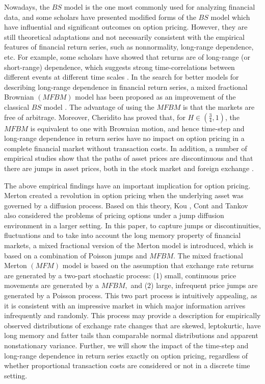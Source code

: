\documentclass[a4paper,11pt]{amsart}
\numberwithin{equation}{section}
\theoremstyle{definition}
\theoremstyle{plain}
\theoremstyle{definition}
\newcommand{\1}{\mathbf{1}}
\begin{document}
Nowadays, the $BS$ model is the one most
commonly used for analyzing financial data, and some
scholars have presented modified forms of the $BS$ model which
have influential and significant outcomes on option pricing.
However, they are still theoretical adaptations and not necessarily
consistent with the empirical features of financial return
series, such as nonnormality, long-range dependence, etc.
For example, some scholars \cite{willinger,ozdemir,mariani,sottinen2003arbitrage,sottinen2016pathwise} have showed that returns are of long-range (or short-range) dependence, which suggests strong time-correlations
between different events at different time scales \cite{cajueiro,cajueiro2,mandelbrot}. In the search
for better models for describing long-range dependence in financial return series, a mixed fractional Brownian $(MFBM)$ model has been proposed as an improvement of the classical $BS$ model \cite{cheridito,mishura,mishura1,shokrollahi1,shokrollahi2,shokrollahi3,shokrollahi5,xiao,cont}. The advantage of
using the $MFBM$ is that the markets are free of arbitrage. Moreover, Cheridito \cite{cheridito}
has proved that, for $H\in(\frac{3}{4},1)$, the $MFBM$ is equivalent to one with Brownian motion, and hence time-step and long-range dependence in return series have no impact on
option pricing in a complete financial market without transaction costs. In addition, a number of empirical studies show that the paths of asset prices are discontinuous and that there are jumps in asset prices, both in the stock market and foreign exchange \cite{mandelbrot,merton,jarrow,ball,shokrollahi4}.

The above empirical findings have an important implication for option pricing.
Merton \cite{merton1} created a revolution in option pricing when the underlying asset was governed by a diffusion process. Based on this theory, Kou \cite{kou2002jump}, Cont and Tankov \cite{cont2002calibration} also considered the problems of pricing options under a jump diffusion environment in a larger setting. In this paper, to capture jumps or discontinuities, fluctuations
and to take into account the long memory property of financial markets, a mixed fractional version of the Merton model is introduced, which is based on a combination
of Poisson jumps and $MFBM$. The mixed fractional Merton $(MFM)$ model is based on the assumption that exchange rate returns are generated by a two-part stochastic process: (1)
small, continuous price movements are generated by a $MFBM,$ and (2) large, infrequent price
jumps are generated by a Poisson process. This two part
process is intuitively appealing, as it is consistent with
an impressive market in which major information arrives
infrequently and randomly. This process may
provide a description for empirically observed distributions
of exchange rate changes that are skewed, leptokurtic, have long
memory and fatter tails than comparable normal distributions
and apparent nonstationary variance.
Further, we will show the impact of the time-step and long-range dependence in return series exactly on option pricing, regardless of whether proportional transaction costs are considered or not in a discrete time setting.
\end{document}
